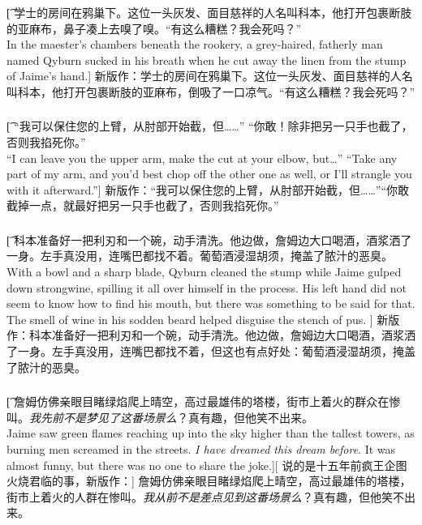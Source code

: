 \documentclass[12pt,a4paper]{article}
\begin{document}
\subsubsection{}\t[
学士的房间在鸦巢下。这位一头灰发、面目慈祥的人名叫科本，他打开包裹断肢的亚麻布，鼻子凑上去嗅了嗅。“有这么糟糕？我会死吗？”\\
In the maester's chambers beneath the rookery, a grey-haired, fatherly man named Qyburn sucked in his breath when he cut away the linen from the stump of Jaime's hand.] 
新版作：学士的房间在鸦巢下。这位一头灰发、面目慈祥的人名叫科本，他打开包裹断肢的亚麻布，倒吸了一口凉气。“有这么糟糕？我会死吗？”

\subsubsection{}\t[
	“我可以保住您的上臂，从肘部开始截，但……”
	“你敢！除非把另一只手也截了，否则我掐死你。” \\
	“I can leave you the upper arm, make the cut at your elbow, but\ldots”
	“Take any part of my arm, and you'd best chop off the other one as well, or I'll strangle you with it afterward.”]
	新版作：“我可以保住您的上臂，从肘部开始截，但……”“你敢截掉一点，就最好把另一只手也截了，否则我掐死你。”
	
\subsubsection{}\t[
科本准备好一把利刃和一个碗，动手清洗。他边做，詹姆边大口喝酒，酒浆洒了一身。左手真没用，连嘴巴都找不着。葡萄酒浸湿胡须，掩盖了脓汁的恶臭。\\
With a bowl and a sharp blade, Qyburn cleaned the stump while Jaime gulped down strongwine, spilling it all over himself in the process. His left hand did not seem to know how to find his mouth, but there was something to be said for that. The smell of wine in his sodden beard helped disguise the stench of pus. ]
新版作：科本准备好一把利刃和一个碗，动手清洗。他边做，詹姆边大口喝酒，酒浆洒了一身。左手真没用，连嘴巴都找不着，但这也有点好处：葡萄酒浸湿胡须，掩盖了脓汁的恶臭。

\subsubsection{}\t[
詹姆仿佛亲眼目睹绿焰爬上晴空，高过最雄伟的塔楼，街市上着火的群众在惨叫。\emph{我先前不是梦见了这番场景么}？真有趣，但他笑不出来。\\
Jaime saw green flames reaching up into the sky higher than the tallest towers, as burning men screamed in the streets. \emph{I have dreamed this dream before}. It was almost funny, but there was no one to share the joke.][
说的是十五年前疯王企图火烧君临的事，新版作：]
詹姆仿佛亲眼目睹绿焰爬上晴空，高过最雄伟的塔楼，街市上着火的人群在惨叫。\emph{我从前不是差点见到这番场景么}？真有趣，但他笑不出来。
\end{document}
